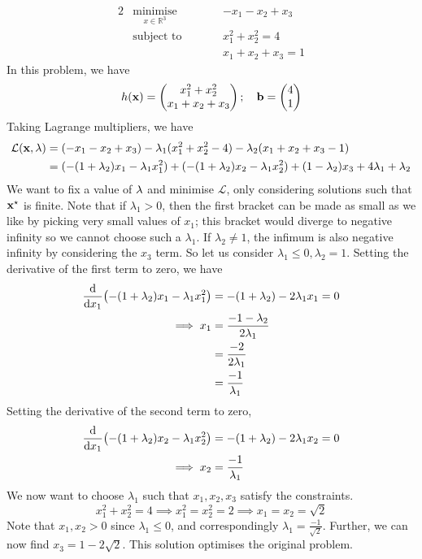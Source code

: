 \begin{example}
    \begin{alignat*}{2}
        &\underset{x \in \mathbb R^3}{\text{minimise}}        &\qquad& -x_1 -x_2 + x_3\\
        &\text{subject to} &      & x_1^2 + x_2^2 = 4\\
        &                  &      & x_1 + x_2 + x_3 = 1
        \end{alignat*}
        In this problem, we have
        \[ h(\vb x) = \begin{pmatrix}
            x_1^2 + x_2^2 \\ x_1 + x_2 + x_3
        \end{pmatrix};\quad \vb b = \begin{pmatrix}
            4 \\ 1
        \end{pmatrix} \]
        Taking Lagrange multipliers, we have
        \begin{align*}
            \mathcal L(\vb x, \vb\lambda) &= (-x_1 - x_2 + x_3) - \lambda_1 (x_1^2 + x_2^2 - 4) - \lambda_2(x_1+x_2 + x_3 - 1) \\
            &= (-(1+\lambda_2) x_1 - \lambda_1 x_1^2) + (-(1 + \lambda_2)x_2 - \lambda_1 x_2^2) + (1 - \lambda_2)x_3 + 4 \lambda_1 + \lambda_2
        \end{align*}
        We want to fix a value of \(\vb \lambda\) and minimise \(\mathcal L\), only considering solutions such that \(\vb x^\star\) is finite.
        Note that if \(\lambda_1 > 0\), then the first bracket can be made as small as we like by picking very small values of \(x_1\); this bracket would diverge to negative infinity so we cannot choose such a \(\lambda_1\).
        If \(\lambda_2 \neq 1\), the infimum is also negative infinity by considering the \(x_3\) term.
        So let us consider \(\lambda_1 \leq 0, \lambda_2 = 1\).
        Setting the derivative of the first term to zero, we have
        \begin{align*}
            \dv{x_1} (-(1+\lambda_2) x_1 - \lambda_1 x_1^2) &= -(1+\lambda_2) - 2 \lambda_1 x_1 = 0 \\
            \implies x_1 &= \frac{-1 - \lambda_2}{2\lambda_1} \\
            &= \frac{-2}{2\lambda_1} \\
            &= \frac{-1}{\lambda_1}
        \end{align*}
        Setting the derivative of the second term to zero,
        \begin{align*}
            \dv{x_1} (-(1+\lambda_2) x_2 - \lambda_1 x_2^2) &= -(1+\lambda_2) - 2 \lambda_1 x_2 = 0 \\
            \implies x_2 &= \frac{-1}{\lambda_1}
        \end{align*}
        We now want to choose \(\lambda_1\) such that \(x_1, x_2, x_3\) satisfy the constraints.
        \[ x_1^2 + x_2^2 = 4 \implies x_1^2 = x_2^2 = 2 \implies x_1 = x_2 = \sqrt{2} \]
        Note that \(x_1, x_2 > 0\) since \(\lambda_1 \leq 0\), and correspondingly \(\lambda_1 = \frac{-1}{\sqrt{2}}\).
        Further, we can now find \(x_3 = 1 - 2\sqrt{2}\).
        This solution optimises the original problem.
\end{example}


